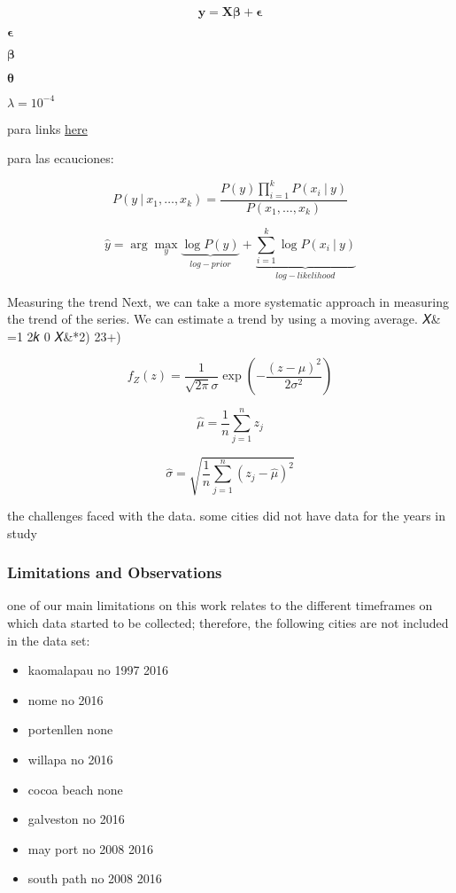 \documentclass[11pt]{article}
\begin{document}
\[\mathbf y = \mathbf X\mathbf \beta + \mathbf \epsilon\]

\(\mathbf \epsilon\)

\(\mathbf \beta\)

\(\mathbf \theta\)

\(\lambda = 10^{-4}\)

para links \href{https://pillow.readthedocs.io/en/latest}{here}

para las ecauciones:

\[ P(y\ |\ x_1,\ldots,x_k) = \frac{P(y) \prod_{i=1}^{k}P(x_i\ |\ y)}{P(x_1,\ldots,x_k)} \]

\[\hat{y} = \arg\max_y \underbrace{\log P(y)}_{log-prior} + \underbrace{\sum_{i=1}^{k} \log P(x_i\ |\ y)}_{log-likelihood}\]

Measuring the trend Next, we can take a more systematic approach in
measuring the trend of the series. We can estimate a trend by using a
moving average. 𝑋\& =1 2𝑘 0 𝑋\&*2) 23+)

\[ f_Z(z) = \frac{1}{\sqrt{2\pi}\sigma} \exp{(-\frac{(z-\mu)^2}{2\sigma^2})} \]

\[ \hat{\mu} = \frac{1}{n} \sum_{j=1}^{n} z_j \]

\[ \hat{\sigma} = \sqrt{\frac{1}{n} \sum_{j=1}^{n} (z_j-\hat{\mu})^2} \]

the challenges faced with the data. some cities did not have data for
the years in study

    \subsubsection{Limitations and
Observations}\label{limitations-and-observations}

one of our main limitations on this work relates to the different
timeframes on which data started to be collected; therefore, the
following cities are not included in the data set:

\begin{itemize}
\item
  kaomalapau no 1997 2016
\item
  nome no 2016
\item
  portenllen none
\item
  willapa no 2016
\item
  cocoa beach none
\item
  galveston no 2016
\item
  may port no 2008 2016
\item
  south path no 2008 2016
\end{itemize}
\end{document}
